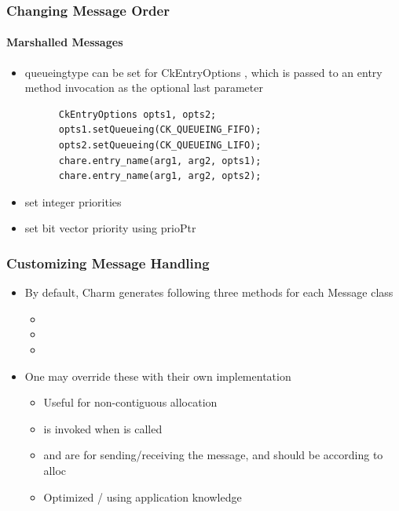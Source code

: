 \begin{frame}[fragile]
  \frametitle{Changing Message Order}
  \framesubtitle{Marshalled Messages}
  \begin{itemize}
    \item queueingtype can be set for CkEntryOptions , which is passed to an entry method invocation as the optional last parameter
    \begin{lstlisting}
      CkEntryOptions opts1, opts2;
      opts1.setQueueing(CK_QUEUEING_FIFO);
      opts2.setQueueing(CK_QUEUEING_LIFO);
      chare.entry_name(arg1, arg2, opts1);
      chare.entry_name(arg1, arg2, opts2);
    \end{lstlisting}
    \item {} set integer priorities
    \item {}  set bit vector priority using prioPtr
  \end{itemize}
\end{frame}

\begin{frame}[fragile]
  \frametitle{Customizing Message Handling}
  \begin{itemize}
    \item By default, Charm generates following three methods for each Message class
    \begin{itemize}
      \item {}
      \item {}
      \item {}
    \end{itemize}
   \item One may override these with their own implementation
   \begin{itemize}
     \item Useful for non-contiguous allocation
     \item {} is invoked when  is called
     \item {} and  are for sending/receiving the message, and should be according to alloc
     \item Optimized / using application knowledge
   \end{itemize}
  \end{itemize}
\end{frame}

